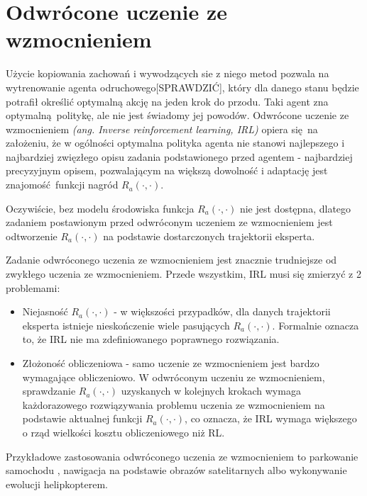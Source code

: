 \section{Odwrócone uczenie ze wzmocnieniem}
Użycie kopiowania zachowań i wywodzących sie z niego metod pozwala na wytrenowanie agenta odruchowego[SPRAWDZIĆ], który dla danego stanu będzie potrafił określić optymalną akcję na jeden krok do przodu. Taki agent zna optymalną politykę, ale nie jest świadomy jej powodów. Odwrócone uczenie ze wzmocnieniem  \textit{(ang. Inverse reinforcement learning, IRL)} opiera się na założeniu, że w ogólności optymalna polityka agenta nie stanowi najlepszego i najbardziej zwięzłego opisu zadania podstawionego przed agentem - najbardziej precyzyjnym opisem, pozwalającym na większą dowolność i adaptację jest znajomość funkcji nagród $R_a(\cdot,\cdot)$.

Oczywiście, bez modelu środowiska funkcja $R_a(\cdot,\cdot)$ nie jest dostępna, dlatego zadaniem postawionym przed odwróconym uczeniem ze wzmocnieniem jest odtworzenie $R_a(\cdot,\cdot)$ na podstawie dostarczonych trajektorii eksperta.

Zadanie odwróconego uczenia ze wzmocnieniem jest znacznie trudniejsze od zwykłego uczenia ze wzmocnieniem. Przede wszystkim, IRL musi się zmierzyć z 2 problemami:

\begin{itemize}
\item Niejasność $R_a(\cdot,\cdot)$ - w większości przypadków, dla danych trajektorii eksperta istnieje nieskończenie wiele pasujących $R_a(\cdot,\cdot)$. Formalnie oznacza to, że IRL nie ma zdefiniowanego poprawnego rozwiązania.
\item Złożoność obliczeniowa - samo uczenie ze wzmocnieniem jest bardzo wymagające obliczeniowo. W odwróconym uczeniu ze wzmocnieniem, sprawdzanie $R_a(\cdot,\cdot)$ uzyskanych w kolejnych krokach wymaga każdorazowego rozwiązywania problemu uczenia ze wzmocnieniem na podstawie aktualnej funkcji $R_a(\cdot,\cdot)$, co oznacza, że IRL wymaga większego o rząd wielkości kosztu obliczeniowego niż RL.
\end{itemize}

Przykładowe zastosowania odwróconego uczenia ze wzmocnieniem to parkowanie samochodu \cite{DBLP:conf/iros/AbbeelDNT08}, nawigacja na podstawie obrazów satelitarnych \cite{Ratliff:2006:MMP:1143844.1143936} albo wykonywanie ewolucji helipkopterem\cite{DBLP:journals/cacm/CoatesAN09}.


